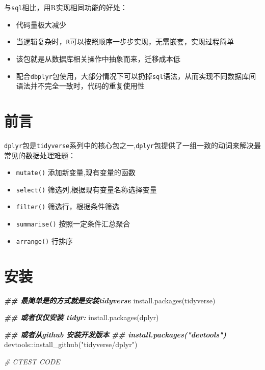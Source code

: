 \documentclass[
]{book}
\newenvironment{Shaded}{\begin{snugshade}}{\end{snugshade}}
\newcommand{\CommentTok}[1]{\textcolor[rgb]{0.56,0.35,0.01}{\textit{#1}}}
\newcommand{\DocumentationTok}[1]{\textcolor[rgb]{0.56,0.35,0.01}{\textbf{\textit{#1}}}}
\newcommand{\FunctionTok}[1]{\textcolor[rgb]{0.00,0.00,0.00}{#1}}
\newcommand{\NormalTok}[1]{#1}
\newcommand{\SpecialCharTok}[1]{\textcolor[rgb]{0.00,0.00,0.00}{#1}}
\newcommand{\StringTok}[1]{\textcolor[rgb]{0.31,0.60,0.02}{#1}}
\begin{document}
与\texttt{sql}相比，用R实现相同功能的好处：

\begin{itemize}
\item
  代码量极大减少
\item
  当逻辑复杂时，\texttt{R}可以按照顺序一步步实现，无需嵌套，实现过程简单
\item
  该包就是从数据库相关操作中抽象而来，迁移成本低
\item
  配合\texttt{dbplyr}包使用，大部分情况下可以扔掉\texttt{sql}语法，从而实现不同数据库间语法并不完全一致时，代码的重复使用性
\end{itemize}

\hypertarget{ux524dux8a00}{%
\section{前言}\label{ux524dux8a00}}

\texttt{dplyr}包是\texttt{tidyverse}系列中的核心包之一,\texttt{dplyr}包提供了一组一致的动词来解决最常见的数据处理难题：

\begin{itemize}
\item
  \texttt{mutate()} 添加新变量,现有变量的函数
\item
  \texttt{select()} 筛选列,根据现有变量名称选择变量
\item
  \texttt{filter()} 筛选行，根据条件筛选
\item
  \texttt{summarise()} 按照一定条件汇总聚合
\item
  \texttt{arrange()} 行排序
\end{itemize}

\hypertarget{ux5b89ux88c5-3}{%
\section{安装}\label{ux5b89ux88c5-3}}

\begin{Shaded}
\begin{Highlighting}[]
\DocumentationTok{\#\# 最简单是的方式就是安装tidyverse}
\FunctionTok{install.packages}\NormalTok{(}\StringTok{\textquotesingle{}tidyverse\textquotesingle{}}\NormalTok{)}

\DocumentationTok{\#\# 或者仅仅安装 tidyr:}
\FunctionTok{install.packages}\NormalTok{(}\StringTok{\textquotesingle{}dplyr\textquotesingle{}}\NormalTok{)}

\DocumentationTok{\#\# 或者从github 安装开发版本}
\DocumentationTok{\#\# install.packages("devtools")}
\NormalTok{devtools}\SpecialCharTok{::}\FunctionTok{install\_github}\NormalTok{(}\StringTok{"tidyverse/dplyr"}\NormalTok{)}

\CommentTok{\# CTEST CODE}
\end{Highlighting}
\end{Shaded}
\end{document}
